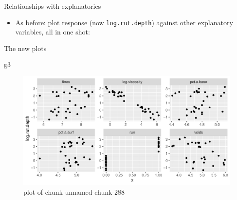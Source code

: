 \documentclass[ignorenonframetext,]{beamer}
\newenvironment{Shaded}{\begin{snugshade}}{\end{snugshade}}
\newcommand{\DataTypeTok}[1]{\textcolor[rgb]{0.13,0.29,0.53}{#1}}
\newcommand{\DecValTok}[1]{\textcolor[rgb]{0.00,0.00,0.81}{#1}}
\newcommand{\KeywordTok}[1]{\textcolor[rgb]{0.13,0.29,0.53}{\textbf{#1}}}
\newcommand{\NormalTok}[1]{#1}
\newcommand{\OperatorTok}[1]{\textcolor[rgb]{0.81,0.36,0.00}{\textbf{#1}}}
\newcommand{\StringTok}[1]{\textcolor[rgb]{0.31,0.60,0.02}{#1}}
\providecommand{\tightlist}{%
  \setlength{\itemsep}{0pt}\setlength{\parskip}{0pt}}
\begin{document}
\begin{frame}[fragile]{Relationships with explanatories}
\protect\hypertarget{relationships-with-explanatories}{}

\begin{itemize}
\tightlist
\item
  As before: plot response (now \texttt{log.rut.depth}) against other
  explanatory variables, all in one shot:
\end{itemize}

\begin{Shaded}
\end{Shaded}

\end{frame}

\begin{frame}[fragile]{The new plots}
\protect\hypertarget{the-new-plots}{}

\begin{Shaded}
\begin{Highlighting}[]
\NormalTok{g3}
\end{Highlighting}
\end{Shaded}

\begin{figure}
\centering
\includegraphics{figure/unnamed-chunk-288-1.pdf}
\caption{plot of chunk unnamed-chunk-288}
\end{figure}

\end{frame}
\end{document}
